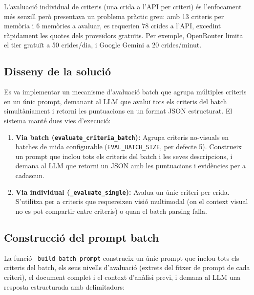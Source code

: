 \documentclass[12pt,a4paper,twoside]{report}
\begin{document}
L'avaluaci\'o individual de criteris (una crida a l'API per criteri) \'es l'enfocament m\'es senzill per\`o presentava un problema pr\`actic greu: amb 13 criteris per mem\`oria i 6 mem\`ories a avaluar, es requerien 78 crides a l'API, excedint r\`apidament les quotes dels prove\"idors gratu\"its. Per exemple, OpenRouter limita el tier gratu\"it a 50 crides/dia, i Google Gemini a 20 crides/minut.

\subsection{Disseny de la soluci\'o}

Es va implementar un mecanisme d'avaluaci\'o batch que agrupa m\'ultiples criteris en un \'unic prompt, demanant al LLM que avalu\"i tots els criteris del batch simult\`aniament i retorni les puntuacions en un format JSON estructurat. El sistema mant\'e dues vies d'execuci\'o:

\begin{enumerate}
    \item \textbf{Via batch (\texttt{evaluate\_criteria\_batch}):} Agrupa criteris no-visuals en batches de mida configurable (\texttt{EVAL\_BATCH\_SIZE}, per defecte 5). Construeix un prompt que inclou tots els criteris del batch i les seves descripcions, i demana al LLM que retorni un JSON amb les puntuacions i evid\`encies per a cadascun.
    \item \textbf{Via individual (\texttt{\_evaluate\_single}):} Avalua un \'unic criteri per crida. S'utilitza per a criteris que requereixen visi\'o multimodal (on el context visual no es pot compartir entre criteris) o quan el batch parsing falla.
\end{enumerate}

\subsection{Construcci\'o del prompt batch}

La funci\'o \texttt{\_build\_batch\_prompt} construeix un \'unic prompt que inclou tots els criteris del batch, els seus nivells d'avaluaci\'o (extrets del fitxer de prompt de cada criteri), el document complet i el context d'an\`alisi previ, i demana al LLM una resposta estructurada amb delimitadors:
\end{document}
